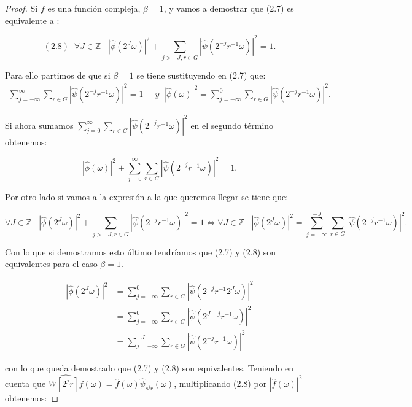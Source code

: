 \begin{proof}
\noindent Si $f$ es una función compleja, $\beta=1$, y vamos a demostrar que (2.7) es equivalente a : 

$$(2.8) \; \; \forall J \in \mathbb{Z} \; \; \; \left|\widehat{\phi}\left(2^J\omega\right)\right|^2 + \sum_{j>-J,r\in G}\left|\widehat{\psi}\left(2^{-j}r^{-1}\omega\right)\right|^2=1. $$

\noindent Para ello partimos de que si $\beta=1$ se tiene sustituyendo en (2.7) que: 
     \begin{align*}
        \sum_{j=-\infty}^\infty \sum_{r \in G} |\widehat{\psi}(2^{-j}r^{-1}\omega)|^2=1 & \; \; y
        \;\;|\widehat{\phi}(\omega)|^2= \sum_{j=-\infty}^0 \sum_{r\in G} |\widehat{\psi}(2^{-j}r^{-1}\omega)|^2.
    \end{align*}

\noindent Si ahora sumamos $\sum_{j=0}^{\infty} \sum_{r\in G} |\widehat{\psi}(2^{-j}r^{-1}\omega)|^2$ en el segundo término obtenemos: 

$$|\widehat{\phi}(\omega)|^2 + \sum_{j=0}^{\infty} \sum_{r\in G} |\widehat{\psi}(2^{-j}r^{-1}\omega)|^2=1.$$

\noindent Por otro lado si vamos a la expresión a la que queremos llegar se tiene que: 

$$\forall J \in \mathbb{Z} \; \; \; \left|\widehat{\phi}\left(2^J\omega\right)\right|^2 + \sum_{j>-J,r\in G}\left|\widehat{\psi}\left(2^{-j}r^{-1}\omega\right)\right|^2=1 \iff \forall J \in \mathbb{Z} \; \; \; \left|\widehat{\phi}\left(2^J\omega\right)\right|^2=\sum_{j=-\infty}^{-J} \sum_{r\in G} |\widehat{\psi}(2^{-j}r^{-1}\omega)|^2.$$

\noindent Con lo que si demostramos esto último tendríamos que (2.7) y (2.8) son equivalentes para el caso $\beta=1$. 


     \begin{align*}
        \left|\widehat{\phi}\left(2^J\omega\right)\right|^2 & =\sum_{j=-\infty}^{0} \sum_{r\in G} |\widehat{\psi}(2^{-j}r^{-1}2^J\omega)|^2 \\
        & = \sum_{j=-\infty}^{0} \sum_{r\in G} |\widehat{\psi}(2^{J-j}r^{-1}\omega)|^2  \\
        & =\sum_{j=-\infty}^{-J} \sum_{r\in G} |\widehat{\psi}(2^{-j}r^{-1}\omega)|^2  
    \end{align*}
    
\noindent con lo que queda demostrado que (2.7) y (2.8) son equivalentes. Teniendo en cuenta que $\widehat{W\left[2^jr\right]f}(\omega)=\widehat{f}(\omega)\widehat{\psi}_{s^jr}(\omega)$, multiplicando (2.8) por $|\widehat{f}(\omega)|^2$ obtenemos: 


\end{proof}
